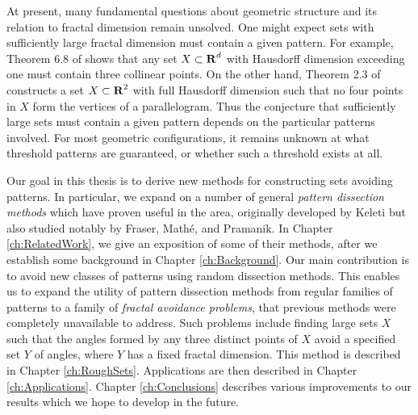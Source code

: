 At present, many fundamental questions about geometric structure and its relation to fractal dimension remain unsolved. One might expect sets with sufficiently large fractal dimension must contain a given pattern. For example, Theorem 6.8 of \cite{Matilla} shows that any set $X \subset \operatorname{\mathbf{R}}^d$ with Hausdorff dimension exceeding one must contain three collinear points. On the other hand, Theorem 2.3 of \cite{Maga} constructs a set $X \subset \operatorname{\mathbf{R}}^2$ with full Hausdorff dimension such that no four points in $X$ form the vertices of a parallelogram. Thus the conjecture that sufficiently large sets must contain a given pattern depends on the particular patterns involved. For most geometric configurations, it remains unknown at what threshold patterns are guaranteed, or whether such a threshold exists at all.


Our goal in this thesis is to derive new methods for constructing sets avoiding patterns. In particular, we expand on a number of general {\it pattern dissection methods} which have proven useful in the area, originally developed by Keleti but also studied notably by Fraser, Math\'{e}, and Pramanik. In Chapter \ref{ch:RelatedWork}, we give an exposition of some of their methods, after we establish some background in Chapter \ref{ch:Background}. Our main contribution is to avoid new classes of patterns using random dissection methods. This enables us to expand the utility of pattern dissection methods from regular families of patterns to a family of {\it fractal avoidance problems}, that previous methods were completely unavailable to address. Such problems include finding large sets $X$ such that the angles formed by any three distinct points of $X$ avoid a specified set $Y$ of angles, where $Y$ has a fixed fractal dimension. This method is described in Chapter \ref{ch:RoughSets}. Applications are then described in Chapter \ref{ch:Applications}. Chapter \ref{ch:Conclusions} describes various improvements to our results which we hope to develop in the future.

\endinput

Any text after an \endinput is ignored.
You could put scraps here or things in progress.